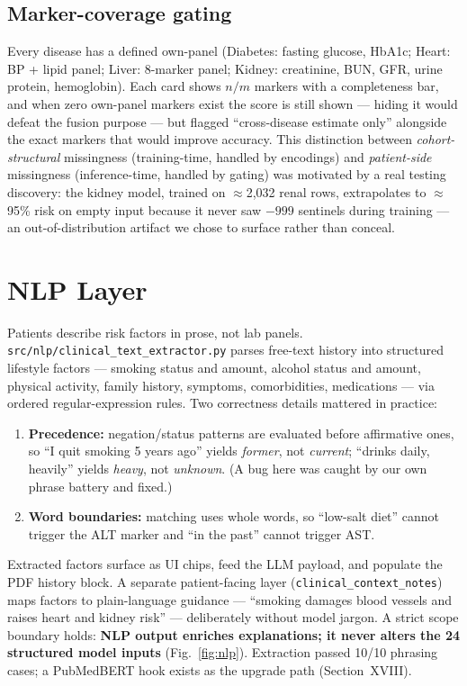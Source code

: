\documentclass[journal]{IEEEtran}
\begin{document}
\subsection{Marker-coverage gating}
Every disease has a defined own-panel (Diabetes: fasting glucose, HbA1c; Heart: BP + lipid panel; Liver: 8-marker panel; Kidney: creatinine, BUN, GFR, urine protein, hemoglobin). Each card shows $n/m$ markers with a completeness bar, and when zero own-panel markers exist the score is still shown --- hiding it would defeat the fusion purpose --- but flagged ``cross-disease estimate only'' alongside the exact markers that would improve accuracy. This distinction between \emph{cohort-structural} missingness (training-time, handled by encodings) and \emph{patient-side} missingness (inference-time, handled by gating) was motivated by a real testing discovery: the kidney model, trained on $\approx$2{,}032 renal rows, extrapolates to $\approx$95\% risk on empty input because it never saw $-999$ sentinels during training --- an out-of-distribution artifact we chose to surface rather than conceal.

\section{NLP Layer}
Patients describe risk factors in prose, not lab panels. \texttt{src/nlp/clinical\_text\_extractor.py} parses free-text history into structured lifestyle factors --- smoking status and amount, alcohol status and amount, physical activity, family history, symptoms, comorbidities, medications --- via ordered regular-expression rules. Two correctness details mattered in practice:
\begin{enumerate}
    \item \textbf{Precedence:} negation/status patterns are evaluated before affirmative ones, so ``I quit smoking 5 years ago'' yields \emph{former}, not \emph{current}; ``drinks daily, heavily'' yields \emph{heavy}, not \emph{unknown}. (A bug here was caught by our own phrase battery and fixed.)
    \item \textbf{Word boundaries:} matching uses whole words, so ``low-salt diet'' cannot trigger the ALT marker and ``in the past'' cannot trigger AST.
\end{enumerate}
Extracted factors surface as UI chips, feed the LLM payload, and populate the PDF history block. A separate patient-facing layer (\texttt{clinical\_context\_notes}) maps factors to plain-language guidance --- ``smoking damages blood vessels and raises heart and kidney risk'' --- deliberately without model jargon. A strict scope boundary holds: \textbf{NLP output enriches explanations; it never alters the 24 structured model inputs} (Fig.~\ref{fig:nlp}). Extraction passed 10/10 phrasing cases; a PubMedBERT hook exists as the upgrade path (Section~XVIII).
\end{document}
